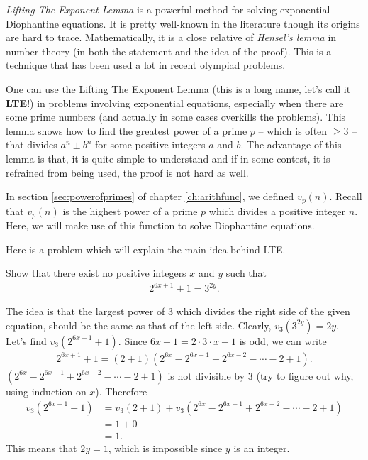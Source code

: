 \documentclass[main.tex]{subfile}
\begin{document}
\textit{Lifting The Exponent Lemma} is a powerful method for solving exponential Diophantine equations. It is pretty well-known in the literature though its origins are hard to trace. Mathematically, it is a close relative of \textit{Hensel's lemma} in number theory (in both the statement and the idea of the proof). This is a technique that has been used a lot in recent olympiad problems.
        
One can use the Lifting The Exponent Lemma (this is a long name, let's call it \textbf{LTE}!) in problems involving exponential equations, especially when there are some prime numbers (and actually in some cases overkills the problems). This lemma shows how to find the greatest power of a prime $p$ -- which is often $\geq 3$ -- that divides $a^n \pm b^n$ for some positive integers $a$ and $b$. The advantage of this lemma is that, it is quite simple to understand and if in some contest, it is refrained from being used, the proof is not hard as well.


In section \eqref{sec:powerofprimes} of chapter \eqref{ch:arithfunc}, we defined $v_p(n)$. Recall that $v_p(n)$ is the highest power of a prime $p$ which divides a positive integer $n$. Here, we will make use of this function to solve Diophantine equations.
    
Here is a problem which will explain the main idea behind LTE.

    \begin{problem}
    	Show that there exist no positive integers $x$ and $y$ such that
    	\begin{align*}
    		2^{6x+1} + 1 = 3^{2y}.
    	\end{align*} 
    \end{problem}
    
    \begin{solution}
    	The idea is that the largest power of $3$ which divides the right side of the given equation, should be the same as that of the left side. Clearly, $v_3(3^{2y})=2y$. Let's find $v_3\left(2^{6x+1} + 1\right)$. Since $6x+1= 2 \cdot 3 \cdot x +1$ is odd, we can write
    	\begin{align*}
    		2^{6x+1} + 1 = \left(2+1\right) \left(2^{6x} - 2^{6x-1} + 2^{6x-2} - \cdots - 2 + 1\right).
    	\end{align*}
    	$\left(2^{6x} - 2^{6x-1} + 2^{6x-2} - \cdots - 2 + 1\right)$ is not divisible by $3$ (try to figure out why, using induction on $x$). Therefore
    	\begin{align*}
    		v_3\left(2^{6x+1} + 1\right) &= v_3\left(2+1\right) + v_3\left(2^{6x} - 2^{6x-1} + 2^{6x-2} - \cdots - 2 + 1\right)\\
    		& = 1 + 0\\
    		& = 1.
    	\end{align*}
    	This means that $2y=1$, which is impossible since $y$ is an integer.
    \end{solution}
    
\end{document}
